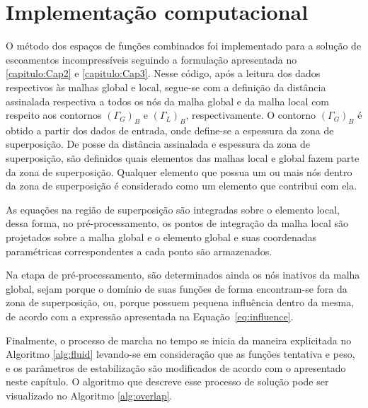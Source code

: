 \section{Implementação computacional}

O método dos espaços de funções combinados foi implementado para a solução de escoamentos incompressíveis seguindo a formulação apresentada no \autoref{capitulo:Cap2} e \autoref{capitulo:Cap3}. Nesse código, após a leitura dos dados respectivos às malhas global e local, segue-se com a definição da distância assinalada respectiva a todos os nós da malha global e da malha local com respeito aos contornos $(\Gamma_{G})_{B}$ e $(\Gamma_{L})_{B}$, respectivamente. O contorno  $(\Gamma_{G})_{B}$ é obtido a partir dos dados de entrada, onde define-se a espessura da zona de superposição. De posse da distância assinalada e espessura da zona de superposição, são definidos quais elementos das malhas local e global fazem parte da zona de superposição. Qualquer elemento que possua um ou mais nós dentro da zona de superposição é considerado como um elemento que contribui com ela.

As equações na região de superposição são integradas sobre o elemento local, dessa forma, no pré-processamento, os pontos de integração da malha local são projetados sobre a malha global e o elemento global e suas coordenadas paramétricas correspondentes a cada ponto são armazenados. 

Na etapa de pré-processamento, são determinados ainda os nós inativos da malha global, sejam porque o domínio de suas funções de forma encontram-se fora da zona de superposição, ou, porque possuem pequena influência dentro da mesma, de acordo com a expressão apresentada na Equação~\eqref{eq:influence}.

Finalmente, o processo de marcha no tempo se inicia da maneira explicitada no Algoritmo \ref{alg:fluid} levando-se em consideração que as funções tentativa e peso, e os parâmetros de estabilização são modificados de acordo com o apresentado neste capítulo. O algoritmo que descreve esse processo de solução pode ser visualizado no Algoritmo \ref{alg:overlap}.

